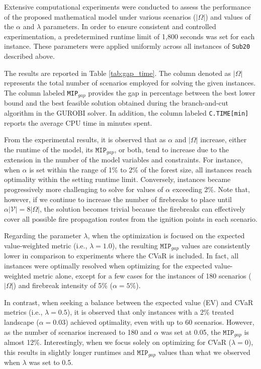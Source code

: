 \documentclass[a4paper,fleqn]{cas-sc}
\begin{document}
Extensive computational experiments were conducted to assess the performance of the proposed mathematical model under various scenarios ($|\Omega|$) and values of the $\alpha$ and $\lambda$ parameters. In order to ensure consistent and controlled experimentation, a predetermined runtime limit of 1,800 seconds was set for each instance. These parameters were applied uniformly across all instances of \texttt{Sub20} described above. 

The results are reported in Table \ref{tab:gap_time}. The column denoted as $|\Omega|$ represents the total number of scenarios employed for solving the given instances. The column labeled \texttt{MIP$_{gap}$} provides the gap in percentage between the best lower bound and the best feasible solution obtained during the branch-and-cut algorithm in the GUROBI solver. In addition, the column labeled \texttt{C.TIME[min]} reports the average CPU time in minutes spent. %



From the experimental results, it is observed that as $\alpha$ and $|\Omega|$ increase, either the runtime of the model, its $\texttt{MIP}_{gap}$, or both, tend to increase due to the extension in the number of the model variables and constraints. For instance, when $\alpha$ is set within the range of 1\% to 2\% of the forest size, all instances reach optimality within the setting runtime limit. Conversely, instances became progressively more challenging to solve for values of $\alpha$ exceeding 2\%. Note that, however, if we continue to increase the number of firebreaks to place until $\alpha\lvert \mathcal{V} \rvert = 8|\Omega|$, the solution becomes trivial because the firebreaks can effectively cover all possible fire propagation routes from the ignition points in each scenario.

Regarding the parameter $\lambda$, when the optimization is focused on the expected value-weighted metric (i.e., $\lambda = 1.0$), the resulting $\texttt{MIP}_{gap}$ values are consistently lower in comparison to experiments where the CVaR is included. In fact, all instances were optimally resolved when optimizing for the expected value-weighted metric alone, except for a few cases for the instances of 180 scenarios ($|\Omega|$) and firebreak intensity of 5\% ($\alpha = 5\%$).

In contrast, when seeking a balance between the expected value (EV) and CVaR metrics (i.e., $\lambda = 0.5$), it is observed that only instances with a 2\% treated landscape ($\alpha = 0.03$) achieved optimality, even with up to 60 scenarios. However, as the number of scenarios increased to 180 and $\alpha$ was set at 0.05, the $\texttt{MIP}_{gap}$ is almost 12\%. Interestingly, when we focus solely on optimizing for CVaR ($\lambda = 0$), this results in slightly longer runtimes and $\texttt{MIP}_{gap}$ values than what we observed when $\lambda$ was set to 0.5.
\end{document}
